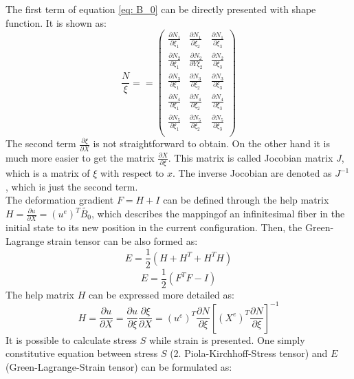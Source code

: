 The first term of equation \ref{eq: B_0} can be directly presented with shape function. It is shown as:
\begin{equation}
\frac{N}{\xi} = = \begin{pmatrix}
\frac{\partial N_1}{\partial \xi_1} & \frac{\partial N_1}{\partial \xi_2} & \frac{\partial N_1}{\partial \xi_3} \\
\frac{\partial N_2}{\partial \xi_1} & \frac{\partial N_2}{\partial Y
	\xi_2} & \frac{\partial N_2}{\partial \xi_3} \\
\frac{\partial N_3}{\partial \xi_1} & \frac{\partial N_3}{\partial \xi_2} & \frac{\partial N_3}{\partial \xi_3} \\
\frac{\partial N_4}{\partial \xi_1} & \frac{\partial N_4}{\partial \xi_2} & \frac{\partial N_4}{\partial \xi_3} \\
\frac{\partial N_5}{\partial \xi_1} & \frac{\partial N_5}{\partial \xi_2} & \frac{\partial N_5}{\partial \xi_3} \\
\end{pmatrix}
\end{equation}
The second term $\frac{\partial \xi}{\partial X}$ is not straightforward to obtain. On the other hand it is much more easier to get the matrix $\frac{\partial X}{\partial \xi}$. This matrix is called Jocobian matrix $J$, which is a matrix of $\xi$ with respect to $x$. The inverse Jocobian are denoted as $J^{-1}$, which is just the second term. \\
The deformation gradient $F = H + I$ can be defined through the help matrix $H = \frac{\partial u}{\partial X} = \left(u^e\right)^T \tilde{B_0}$, which describes the mappingof an infinitesimal fiber in the initial state to its new position in the current configuration. Then, the Green-Lagrange strain tensor can be also formed as:
\begin{equation}
E = \frac{1}{2} \left(H + H^T + H^T H\right)
\end{equation}
\begin{equation} \label{eq: E_eq}
E = \frac{1}{2} \left(F^T F - I\right)
\end{equation}
The help matrix $H$ can be expressed more detailed as:
\begin{equation} \label{eq: Help_matrix}
H = \frac{\partial u}{\partial X} = \frac{\partial u}{\partial \xi} \frac{\partial \xi}{\partial X} = \left(u^e\right)^T \frac{\partial N}{\partial \xi} \left[ \left(X^e\right)^T \frac{\partial N}{\partial \xi}\right]^{-1}
\end{equation}
It is possible to calculate stress $S$ while strain is presented. One simply constitutive equation between stress $S$ (2. Piola-Kirchhoff-Stress tensor) and $E$ (Green-Lagrange-Strain tensor) can be formulated as:
